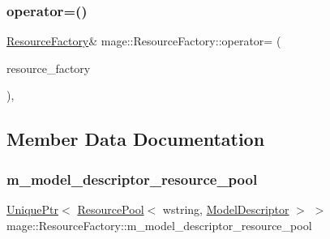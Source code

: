 \subsubsection{\texorpdfstring{operator=()}{operator=()}\hspace{0.1cm}{\footnotesize\ttfamily [2/2]}}
{\footnotesize\ttfamily \hyperlink{classmage_1_1_resource_factory}{Resource\+Factory}\& mage\+::\+Resource\+Factory\+::operator= (\begin{DoxyParamCaption}\item[{\hyperlink{classmage_1_1_resource_factory}{Resource\+Factory} \&\&}]{resource\+\_\+factory }\end{DoxyParamCaption})\hspace{0.3cm}{\ttfamily [private]}, {\ttfamily [delete]}}



\subsection{Member Data Documentation}
\hypertarget{classmage_1_1_resource_factory_a1739407c8918b375e7feaa2240628bde}{}\label{classmage_1_1_resource_factory_a1739407c8918b375e7feaa2240628bde} 
\subsubsection{\texorpdfstring{m\+\_\+model\+\_\+descriptor\+\_\+resource\+\_\+pool}{m\_model\_descriptor\_resource\_pool}}
{\footnotesize\ttfamily \hyperlink{namespacemage_a8c307fbcc33bce9b7f2aa4c26c3b95cf}{Unique\+Ptr}$<$ \hyperlink{classmage_1_1_resource_pool}{Resource\+Pool}$<$ wstring, \hyperlink{classmage_1_1_model_descriptor}{Model\+Descriptor} $>$ $>$ mage\+::\+Resource\+Factory\+::m\+\_\+model\+\_\+descriptor\+\_\+resource\+\_\+pool\hspace{0.3cm}{\ttfamily [private]}}

\hypertarget{classmage_1_1_resource_factory_a987af631d0fda02fd336ceb02113a128}{}\label{classmage_1_1_resource_factory_a987af631d0fda02fd336ceb02113a128} 

